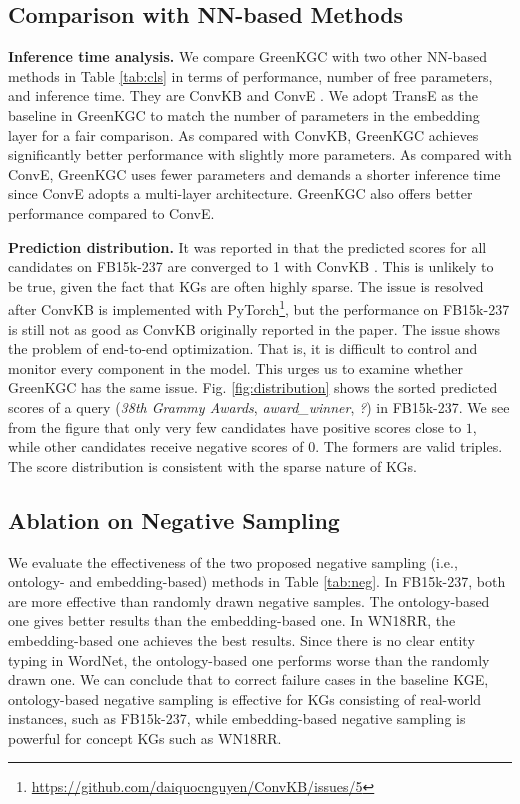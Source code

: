 \documentclass{article}
\begin{document}
\subsection{Comparison with NN-based Methods}

\textbf{Inference time analysis.} We compare GreenKGC with two other 
NN-based methods in Table \ref{tab:cls} in terms of performance, 
number of free parameters, and inference time. They are ConvKB \citep{nguyen2018novel}
and ConvE \citep{dettmers2018convolutional}. We adopt TransE as the baseline in GreenKGC
to match the number of parameters in the embedding layer for a fair comparison.
As compared with ConvKB, GreenKGC achieves significantly better performance
with slightly more parameters. As compared with ConvE, GreenKGC uses fewer 
parameters and demands a shorter inference time since ConvE adopts a multi-layer 
architecture. GreenKGC also offers better performance compared to ConvE.

\textbf{Prediction distribution.} It was reported in \citet{sun2020evaluation} 
that the predicted scores for all candidates on FB15k-237 are converged to 1 with ConvKB
\citep{nguyen2018novel}.  This is unlikely to be true, given the fact
that KGs are often highly sparse. The issue is resolved after ConvKB is
implemented with PyTorch\footnote{\url{https://github.com/daiquocnguyen/ConvKB/issues/5}}, 
but the performance on FB15k-237 is still not as good as ConvKB
originally reported in the paper. The issue shows the problem of
end-to-end optimization. That is, it is difficult to control and monitor
every component in the model. This urges us to examine whether GreenKGC
has the same issue. Fig. \ref{fig:distribution} shows the sorted
predicted scores of a query (\emph{38th Grammy Awards}, \emph{award\_winner},
\emph{?}) in FB15k-237. We see from the figure that
only very few candidates have positive scores close to $1$, while other
candidates receive negative scores of 0. The formers are valid triples.
The score distribution is consistent with the sparse nature of KGs. 


\subsection{Ablation on Negative Sampling}

We evaluate the 
effectiveness of the two proposed negative sampling
(i.e., ontology- and embedding-based) methods in Table \ref{tab:neg}. In
FB15k-237, both are more effective than randomly drawn negative samples.
The ontology-based one gives better results than the embedding-based
one. In WN18RR, the embedding-based one achieves the best results.
Since there is no clear entity typing in WordNet, the
ontology-based one performs worse than the randomly drawn one. We can
conclude that to correct failure cases in the baseline KGE,
ontology-based negative sampling is effective for KGs consisting of 
real-world instances, such as
FB15k-237, while embedding-based negative sampling is powerful for
concept KGs such as WN18RR. 
\end{document}
